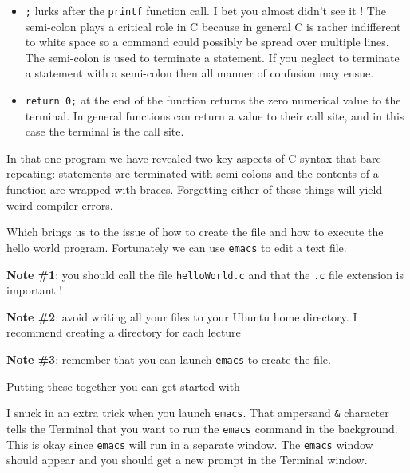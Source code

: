 \begin{itemize}
    \item \texttt{;} lurks after the \texttt{printf} function call. I bet you almost didn't see it ! The semi-colon plays a critical role in C because in general C is rather indifferent to white space so a command could possibly be spread over multiple lines. The semi-colon is used to terminate a statement. If you neglect to terminate a statement with a semi-colon then all manner of confusion may ensue.
    \item \texttt{return 0;} at the end of the function returns the zero numerical value to the terminal. In general functions can return a value to their call site, and in this case the terminal is the call site.
\end{itemize}

In that one program we have revealed two key aspects of C syntax that bare repeating: statements are terminated with semi-colons and the contents of a function are wrapped with braces. Forgetting either of these things will yield weird compiler errors. 

Which brings us to the issue of how to create the file and how to execute the hello world program. Fortunately we can use \texttt{emacs} to edit a text file. 

{\bf Note \#1}: you should call the file \texttt{helloWorld.c} and that the \texttt{.c} file extension is important !

{\bf Note \#2}: avoid writing all your files to your Ubuntu home directory. I recommend creating a directory for each lecture

{\bf Note \#3}: remember that you can launch \texttt{emacs} to create the file. 

Putting these together you can get started with 


I snuck in an extra trick when you launch \texttt{emacs}. That ampersand \texttt{\&} character tells the Terminal that you want to run the \texttt{emacs} command in the background. This is okay since \texttt{emacs} will run in a separate window. The \texttt{emacs} window should appear and you should get a new prompt in the Terminal window.


